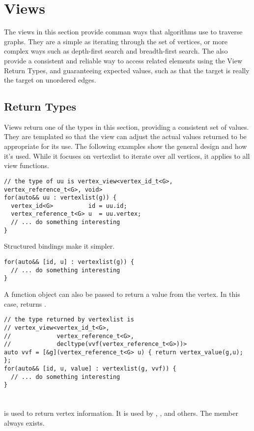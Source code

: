 \section{Views}
The views in this section provide comman ways that algorithms use to traverse graphs. They are a simple as iterating through the set of vertices, or more complex ways such as depth-first search and breadth-first search. The also provide a consistent and reliable way to access related elements using the View Return Types, and guaranteeing expected values, such as that the target is really the target on unordered edges.

\subsection{Return Types}
Views return one of the types in this section, providing a consistent set of values. They are templated so that the view can adjust the actual values returned to be appropriate for its use. The following examples show the general design and how it's used. While it focuses on vertexlist to iterate over all vertices, it applies to all view functions.

\begin{lstlisting}
// the type of uu is vertex_view<vertex_id_t<G>, vertex_reference_t<G>, void>
for(auto&& uu : vertexlist(g)) {
  vertex_id<G>          id = uu.id;
  vertex_reference_t<G> u  = uu.vertex;
  // ... do something interesting
}
\end{lstlisting}

Structured bindings make it simpler.
\begin{lstlisting}
for(auto&& [id, u] : vertexlist(g)) {
  // ... do something interesting
}
\end{lstlisting}

A function object can also be passed to return a value from the vertex. In this case,  returns .
\begin{lstlisting}
// the type returned by vertexlist is 
// vertex_view<vertex_id_t<G>, 
//             vertex_reference_t<G>, 
//             decltype(vvf(vertex_reference_t<G>))>
auto vvf = [&g](vertex_reference_t<G> u) { return vertex_value(g,u); };
for(auto&& [id, u, value] : vertexlist(g, vvf)) {
  // ... do something interesting
}
\end{lstlisting}

\paragraph{}\label{vertex-view}\mbox{} \\
 is used to return vertex information. It is used by , ,  and others. The  member always exists.

